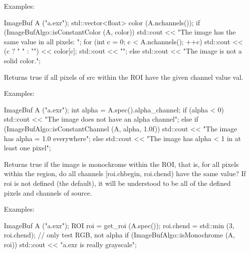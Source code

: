 \smallskip
\noindent Examples:
\begin{code}
    ImageBuf A ("a.exr");
    std::vector<float> color (A.nchannels());
    if (ImageBufAlgo::isConstantColor (A, color)) {
        std::cout << "The image has the same value in all pixels: ";
        for (int c = 0;  c < A.nchannels();  ++c)
            std::cout << (c ? " " : "") << color[c];
        std::cout << "\n";
    } else {
        std::cout << "The image is not a solid color.\n";
    }
\end{code}
\apiend


 

Returns {\cf true} if all pixels of {\cf src} within the ROI have the
given {\cf channel} value {\cf val}.

\smallskip
\noindent Examples:
\begin{code}
    ImageBuf A ("a.exr");
    int alpha = A.spec().alpha_channel;
    if (alpha < 0)
        std::cout << "The image does not have an alpha channel\n";
    else if (ImageBufAlgo::isConstantChannel (A, alpha, 1.0f))
        std::cout << "The image has alpha = 1.0 everywhere\n";
    else
        std::cout << "The image has alpha < 1 in at least one pixel\n";
\end{code}
\apiend

 

Returns {\cf true} if the image is monochrome within the ROI, that is,
for all pixels within the region, do all channels {\cf [roi.chbegin, roi.chend)}
have the same value?  If roi is not defined (the default), it will be
understood to be all of the defined pixels and channels of source.

\smallskip
\noindent Examples:
\begin{code}
    ImageBuf A ("a.exr");
    ROI roi = get_roi (A.spec());
    roi.chend = std::min (3, roi.chend);  // only test RGB, not alpha
    if (ImageBufAlgo::isMonochrome (A, roi))
        std::cout << "a.exr is really grayscale\n";
\end{code}
\apiend


 


